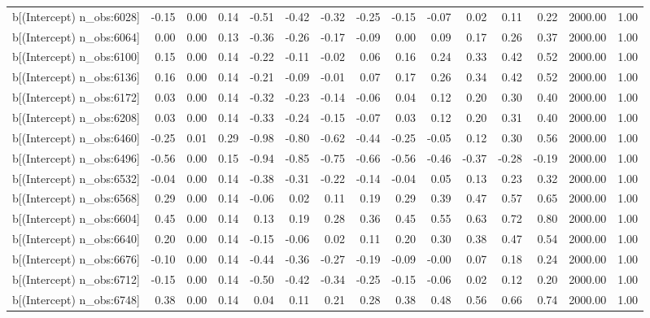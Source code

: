 \begin{table}[ht]
\begin{tabular}{rrrrrrrrrrrrrrr}
  b[(Intercept) n\_obs:6028] & -0.15 & 0.00 & 0.14 & -0.51 & -0.42 & -0.32 & -0.25 & -0.15 & -0.07 & 0.02 & 0.11 & 0.22 & 2000.00 & 1.00 \\ 
  b[(Intercept) n\_obs:6064] & 0.00 & 0.00 & 0.13 & -0.36 & -0.26 & -0.17 & -0.09 & 0.00 & 0.09 & 0.17 & 0.26 & 0.37 & 2000.00 & 1.00 \\ 
  b[(Intercept) n\_obs:6100] & 0.15 & 0.00 & 0.14 & -0.22 & -0.11 & -0.02 & 0.06 & 0.16 & 0.24 & 0.33 & 0.42 & 0.52 & 2000.00 & 1.00 \\ 
  b[(Intercept) n\_obs:6136] & 0.16 & 0.00 & 0.14 & -0.21 & -0.09 & -0.01 & 0.07 & 0.17 & 0.26 & 0.34 & 0.42 & 0.52 & 2000.00 & 1.00 \\ 
  b[(Intercept) n\_obs:6172] & 0.03 & 0.00 & 0.14 & -0.32 & -0.23 & -0.14 & -0.06 & 0.04 & 0.12 & 0.20 & 0.30 & 0.40 & 2000.00 & 1.00 \\ 
  b[(Intercept) n\_obs:6208] & 0.03 & 0.00 & 0.14 & -0.33 & -0.24 & -0.15 & -0.07 & 0.03 & 0.12 & 0.20 & 0.31 & 0.40 & 2000.00 & 1.00 \\ 
  b[(Intercept) n\_obs:6460] & -0.25 & 0.01 & 0.29 & -0.98 & -0.80 & -0.62 & -0.44 & -0.25 & -0.05 & 0.12 & 0.30 & 0.56 & 2000.00 & 1.00 \\ 
  b[(Intercept) n\_obs:6496] & -0.56 & 0.00 & 0.15 & -0.94 & -0.85 & -0.75 & -0.66 & -0.56 & -0.46 & -0.37 & -0.28 & -0.19 & 2000.00 & 1.00 \\ 
  b[(Intercept) n\_obs:6532] & -0.04 & 0.00 & 0.14 & -0.38 & -0.31 & -0.22 & -0.14 & -0.04 & 0.05 & 0.13 & 0.23 & 0.32 & 2000.00 & 1.00 \\ 
  b[(Intercept) n\_obs:6568] & 0.29 & 0.00 & 0.14 & -0.06 & 0.02 & 0.11 & 0.19 & 0.29 & 0.39 & 0.47 & 0.57 & 0.65 & 2000.00 & 1.00 \\ 
  b[(Intercept) n\_obs:6604] & 0.45 & 0.00 & 0.14 & 0.13 & 0.19 & 0.28 & 0.36 & 0.45 & 0.55 & 0.63 & 0.72 & 0.80 & 2000.00 & 1.00 \\ 
  b[(Intercept) n\_obs:6640] & 0.20 & 0.00 & 0.14 & -0.15 & -0.06 & 0.02 & 0.11 & 0.20 & 0.30 & 0.38 & 0.47 & 0.54 & 2000.00 & 1.00 \\ 
  b[(Intercept) n\_obs:6676] & -0.10 & 0.00 & 0.14 & -0.44 & -0.36 & -0.27 & -0.19 & -0.09 & -0.00 & 0.07 & 0.18 & 0.24 & 2000.00 & 1.00 \\ 
  b[(Intercept) n\_obs:6712] & -0.15 & 0.00 & 0.14 & -0.50 & -0.42 & -0.34 & -0.25 & -0.15 & -0.06 & 0.02 & 0.12 & 0.20 & 2000.00 & 1.00 \\ 
  b[(Intercept) n\_obs:6748] & 0.38 & 0.00 & 0.14 & 0.04 & 0.11 & 0.21 & 0.28 & 0.38 & 0.48 & 0.56 & 0.66 & 0.74 & 2000.00 & 1.00 \\ 

\end{tabular}
\end{table}
